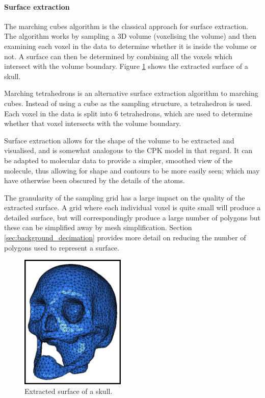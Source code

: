 
\paragraph{Surface extraction}

The marching cubes algorithm \citep{lorensen87} is the classical approach for
surface extraction. The algorithm works by sampling a 3D volume (voxelising the
volume) and then examining each voxel in the data to determine whether it is
inside the volume or not. A surface can then be determined by combining all the
voxels which intersect with the volume boundary. Figure
\ref{fig:background_mesh} shows the extracted surface of a skull.

Marching tetrahedrons is an alternative surface extraction algorithm to
marching cubes. Instead of using a cube as the sampling structure, a
tetrahedron is used. Each voxel in the data is split into 6 tetrahedrons, which
are used to determine whether that voxel intersects with the volume boundary.

Surface extraction allows for the shape of the volume to be extracted and
visualised, and is somewhat analogous to the CPK model in that regard. It can
be adapted to molecular data to provide a simpler, smoothed view of the
molecule, thus allowing for shape and contours to be more easily seen; which
may have otherwise been obscured by the details of the atoms.

The granularity of the sampling grid has a large impact on the quality of the
extracted surface. A grid where each individual voxel is quite small will
produce a detailed surface, but will correspondingly produce a large number of
polygons but these can be simplified away by mesh simplification. Section
\ref{sec:background_decimation} provides more detail on reducing the number of
polygons used to represent a surface.

\begin{figure}
  \begin{center}
    \includegraphics[width=50mm]{surface_mesh}
  \end{center}
  \caption{Extracted surface of a skull.}
  \label{fig:background_mesh}
\end{figure}

